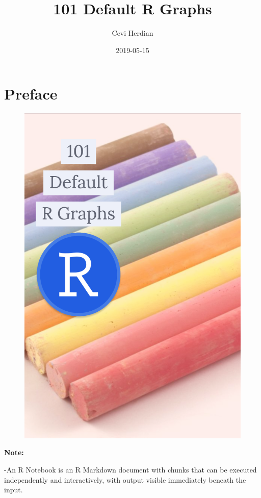 \documentclass[]{book}
\title{101 Default R Graphs}
\author{Cevi Herdian}
\date{2019-05-15}
\begin{document}
\maketitle

{
\setcounter{tocdepth}{1}
\tableofcontents
}
\chapter{Preface}\label{preface}

\begin{figure}
\centering
\includegraphics{coverbook.png}
\caption{}
\end{figure}

\textbf{Note:}

-An R Notebook is an R Markdown document with chunks that can be
executed independently and interactively, with output visible
immediately beneath the input.
\end{document}
